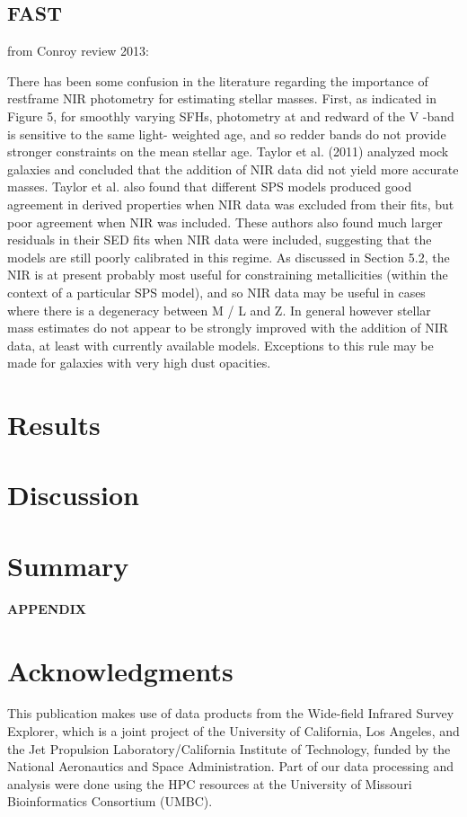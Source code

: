 \documentclass[apj,iop]{emulateapj}
\begin{document}
\subsection{FAST} 
	from Conroy review 2013:
	
	There has been some confusion in the literature regarding the importance of restframe NIR photometry for estimating stellar masses. First, as indicated in Figure 5, for smoothly varying SFHs, photometry at and redward of the V -band is sensitive to the same light- weighted age, and so redder bands do not provide stronger constraints on the mean stellar age. Taylor et al. (2011) analyzed mock galaxies and concluded that the addition of NIR data did not yield more accurate masses. Taylor et al. also found that different SPS models produced good agreement in derived properties when NIR data was excluded from their fits, but poor agreement when NIR was included. These authors also found much larger residuals in their SED fits when NIR data were included, suggesting that the models are still poorly calibrated in this regime. As discussed in Section 5.2, the NIR is at present probably most useful for constraining metallicities (within the context of a particular SPS model), and so NIR data may be useful in cases where there is a degeneracy between M / L and Z. In general however stellar mass estimates do not appear to be strongly improved with the addition of NIR data, at least with currently available models. Exceptions to this rule may be made for galaxies with very high dust opacities.
\section{Results}

\section{Discussion}

\section{Summary}


\acknowledgements


{}
%

\newpage
\centerline{ {\bf APPENDIX}}
\appendix

\section{Acknowledgments}
This publication makes use of data products from the Wide-field Infrared Survey Explorer, which is a joint project of the University of California, Los Angeles, and the Jet Propulsion Laboratory/California Institute of Technology, funded by the National Aeronautics and Space Administration. Part of our data processing and analysis were done using the HPC resources at the University of Missouri Bioinformatics Consortium (UMBC).
\end{document}
